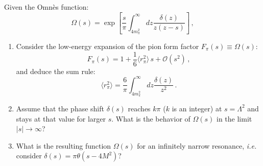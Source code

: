 
Given the Omn\`{e}s function:
\begin{equation}
    \Omega(s)=\exp\left[\frac{s}{\pi}\int_{4m_{\pi}^{2}}^{\infty}dz\frac{\delta(z)}{z(z-s)}\right]\,,
    \label{Eq:Omnes}
\end{equation}

\begin{enumerate}
    \item Consider the low-energy expansion of the pion form factor $F_{\pi}(s)\equiv\Omega(s)$:
          \begin{equation}
              F_{\pi}(s)=1+\frac{1}{6}\langle r^{2}_{\pi}\rangle\,s+\mathcal{O}(s^{2})\,,
          \end{equation}
          and deduce the sum rule:
          \begin{equation}
              \langle r^{2}_{\pi}\rangle=\frac{6}{\pi}\int_{4m_{\pi}^{2}}^{\infty}dz\frac{\delta(z)}{z^{2}}\,.
          \end{equation}
    \item Assume that the phase shift $\delta(s)$ reaches $k\pi$ ($k$ is an integer) at $s=\Lambda^{2}$ and stays at that value for larger $s$. What is the behavior of $\Omega(s)$ in the limit $|s|\to\infty$?\\
    \item What is the resulting function $\Omega(s)$ for an infinitely narrow resonance, {\it{i.e.}} consider \mbox{$\delta(s)=\pi\theta(s-4M^{2})$}?
\end{enumerate}
